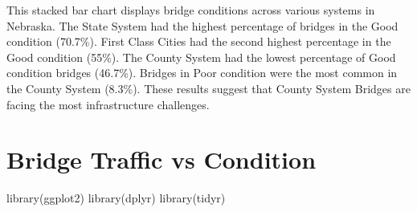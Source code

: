 \documentclass[
  letterpaper,
  DIV=11,
  numbers=noendperiod]{scrreprt}
\newenvironment{Shaded}{\begin{snugshade}}{\end{snugshade}}
\newcommand{\FunctionTok}[1]{\textcolor[rgb]{0.28,0.35,0.67}{#1}}
\newcommand{\NormalTok}[1]{\textcolor[rgb]{0.00,0.23,0.31}{#1}}
\begin{document}
This stacked bar chart displays bridge conditions across various systems
in Nebraska. The State System had the highest percentage of bridges in
the Good condition (70.7\%). First Class Cities had the second highest
percentage in the Good condition (55\%). The County System had the
lowest percentage of Good condition bridges (46.7\%). Bridges in Poor
condition were the most common in the County System (8.3\%). These
results suggest that County System Bridges are facing the most
infrastructure challenges.

\section{Bridge Traffic vs
Condition}\label{bridge-traffic-vs-condition-1}

\begin{Shaded}
\begin{Highlighting}[]
\FunctionTok{library}\NormalTok{(ggplot2)}
\FunctionTok{library}\NormalTok{(dplyr)}
\FunctionTok{library}\NormalTok{(tidyr)}


\end{Highlighting}
\end{Shaded}
\end{document}

